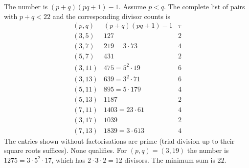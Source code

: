 The number is $(p+q)(pq+1)-1$. Assume $p<q$. The complete list of pairs with $p+q<22$ and the corresponding divisor counts is
\[
\begin{array}{c|r|r}
(p,q)&(p+q)(pq+1)-1&\tau\\\hline
(3,5)&127&2\\(3,7)&219=3\cdot73&4\\
(5,7)&431&2\\(3,11)&475=5^2\cdot19&6\\
(3,13)&639=3^2\cdot71&6\\(5,11)&895=5\cdot179&4\\
(5,13)&1187&2\\(7,11)&1403=23\cdot61&4\\
(3,17)&1039&2\\(7,13)&1839=3\cdot613&4
\end{array}
\]
The entries shown without factorisations are prime (trial division up to their square roots suffices). None qualifies. For $(p,q)=(3,19)$ the number is $1275=3\cdot5^2\cdot17$, which has $2\cdot3\cdot2=12$ divisors. The minimum sum is $\boxed{22}$.
